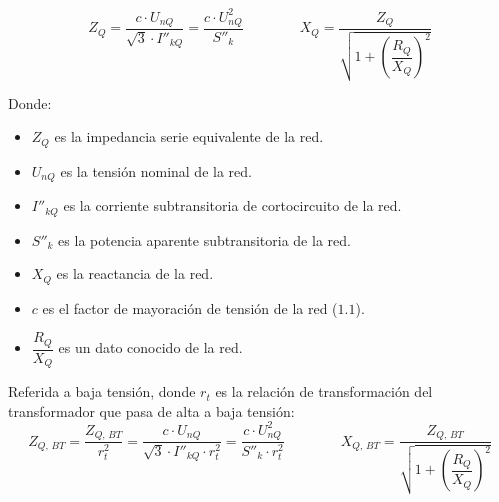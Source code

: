 \begin{itemize}
                \begin{equation}
                    Z_\textit{Q} = \dfrac{c\cdot U_\textit{nQ}}{\sqrt{3}\cdot I''_\textit{kQ}} = \dfrac{c\cdot U_\textit{nQ}^2}{S''_\textit{k}} \qquad \qquad X_\textit{Q} = \dfrac{Z_\textit{Q}}{\sqrt{1+\left(\dfrac{R_\textit{Q}}{X_\textit{Q}}\right)^2}}
                \end{equation}

                Donde:
                \begin{itemize}
                    \item $Z_\textit{Q}$ es la impedancia serie equivalente de la red.
                    \item $U_\textit{nQ}$ es la tensión nominal de la red.
                    \item $I''_\textit{kQ}$ es la corriente subtransitoria de cortocircuito de la red.
                    \item $S''_\textit{k}$ es la potencia aparente subtransitoria de la red.
                    \item $X_\textit{Q}$ es la reactancia de la red.
                    \item $c$ es el factor de mayoración de tensión de la red ($1.1$).
                    \item $\dfrac{R_\textit{Q}}{X_\textit{Q}}$ es un dato conocido de la red.
                \end{itemize}

                Referida a baja tensión, donde $r_t$ es la relación de transformación del transformador que pasa de alta a baja tensión:
                \begin{equation}
                    Z_\textit{Q, BT} = \dfrac{Z_\textit{Q, BT}}{r_t^2} = \dfrac{c\cdot U_\textit{nQ}}{\sqrt{3}\cdot I''_\textit{kQ}\cdot r_t^2} = \dfrac{c\cdot U_\textit{nQ}^2}{S''_\textit{k}\cdot r_t^2} \qquad \qquad X_\textit{Q, BT} = \dfrac{Z_\textit{Q, BT}}{\sqrt{1+\left(\dfrac{R_\textit{Q}}{X_\textit{Q}}\right)^2}}
                \end{equation}
            

\end{itemize}
